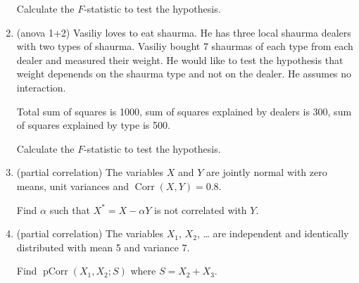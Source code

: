 \documentclass[12pt]{article}
\DeclareMathOperator{\Corr}{Corr}
\DeclareMathOperator{\pCorr}{pCorr}
\begin{document}
\begin{enumerate}
    Calculate the $F$-statistic to test the hypothesis.
    
    \item (anova 1+2) Vasiliy loves to eat shaurma. He has three local shaurma dealers with two types of shaurma.  
    Vasiliy bought 7 shaurmas of each type from each dealer 
    and measured their weight. He would like to test the hypothesis that weight depenends on the shaurma type and not on the dealer.
    He assumes no interaction.  

    Total sum of squares is 1000, sum of squares explained by dealers is 300, sum of squares explained by type is 500. 

    Calculate the $F$-statistic to test the hypothesis.

    \item (partial correlation) The variables $X$ and $Y$ are jointly normal with zero means,
unit variances and $\Corr(X, Y) = 0.8$. 

Find $\alpha$ such that $X^* = X - \alpha Y$ is not correlated with $Y$. 

\item (partial correlation) The variables $X_1$, $X_2$, \ldots{ } are independent and identically distributed with mean 5 and variance 7. 

Find $\pCorr(X_1, X_2; S)$ where $S = X_2 + X_3$.
    
    
\end{enumerate}
\end{document}
